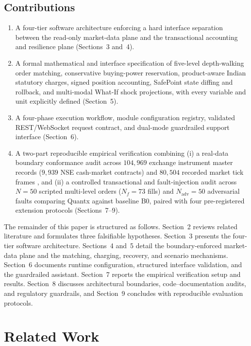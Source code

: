 \documentclass[12pt]{article}
\begin{document}
\subsection{Contributions}
\begin{enumerate}
  \item A four-tier software architecture enforcing a hard interface separation between the read-only market-data plane and the transactional accounting and resilience plane (Sections~3 and~4).
  \item A formal mathematical and interface specification of five-level depth-walking order matching, conservative buying-power reservation, product-aware Indian statutory charges, signed position accounting, SafePoint state diffing and rollback, and multi-modal What-If shock projections, with every variable and unit explicitly defined (Section~5).
  \item A four-phase execution workflow, module configuration registry, validated REST/WebSocket request contract, and dual-mode guardrailed support interface (Section~6).
  \item A two-part reproducible empirical verification combining (i) a real-data boundary conformance audit across $104{,}969$ exchange instrument master records ($9{,}939$ NSE cash-market contracts) and $80{,}504$ recorded market tick frames \cite{quantx_dataset}, and (ii) a controlled transactional and fault-injection audit across $N=50$ scripted multi-level orders ($N_f=73$ fills) and $N_{\mathrm{adv}}=50$ adversarial faults comparing Quantx against baseline B0, paired with four pre-registered extension protocols (Sections~7--9).
\end{enumerate}

The remainder of this paper is structured as follows. Section~2 reviews related literature and formulates three falsifiable hypotheses. Section~3 presents the four-tier software architecture. Sections~4 and~5 detail the boundary-enforced market-data plane and the matching, charging, recovery, and scenario mechanisms. Section~6 documents runtime configuration, structured interface validation, and the guardrailed assistant. Section~7 reports the empirical verification setup and results. Section~8 discusses architectural boundaries, code--documentation audits, and regulatory guardrails, and Section~9 concludes with reproducible evaluation protocols.

\section{Related Work}
\end{document}
